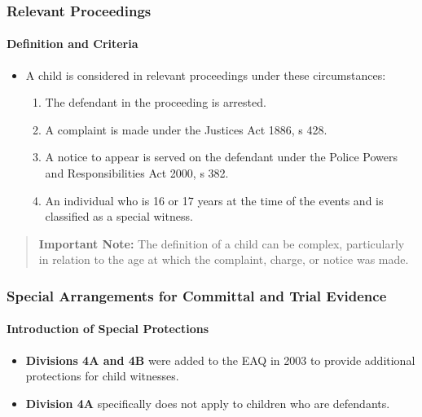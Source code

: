 \subsubsection{Relevant Proceedings}\label{relevant-proceedings}

\paragraph{Definition and Criteria}\label{definition-and-criteria}

\begin{itemize}
\tightlist
\item
  A child is considered in relevant proceedings under these
  circumstances:

  \begin{enumerate}
  \def\labelenumi{\arabic{enumi}.}
  \tightlist
  \item
    The defendant in the proceeding is arrested.
  \item
    A complaint is made under the Justices Act 1886, s 428.
  \item
    A notice to appear is served on the defendant under the Police
    Powers and Responsibilities Act 2000, s 382.
  \item
    An individual who is 16 or 17 years at the time of the events and is
    classified as a special witness.
  \end{enumerate}
\end{itemize}

\begin{quote}
\textbf{Important Note:} The definition of a child can be complex,
particularly in relation to the age at which the complaint, charge, or
notice was made.
\end{quote}

\subsubsection{Special Arrangements for Committal and Trial
Evidence}\label{special-arrangements-for-committal-and-trial-evidence}

\paragraph{Introduction of Special
Protections}\label{introduction-of-special-protections}

\begin{itemize}
\tightlist
\item
  \textbf{Divisions 4A and 4B} were added to the EAQ in 2003 to provide
  additional protections for child witnesses.
\item
  \textbf{Division 4A} specifically does not apply to children who are
  defendants.
\end{itemize}


